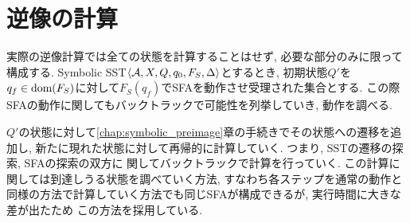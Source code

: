 \documentclass[uplatex,dvipdfmx,a4j]{jsreport}
\begin{document}
  \section{逆像の計算}

  実際の逆像計算では全ての状態を計算することはせず, 必要な部分のみに限って構成する.
  Symbolic SST${\langle {\mathcal{A}, X, Q, q_0, F_S, \Delta} \rangle}$とするとき,
  初期状態$Q'$を$q_f \in \mbox{dom}(F_S)$に対して$F_S(q_f)$でSFAを動作させ受理された集合とする.
  この際SFAの動作に関してもバックトラックで可能性を列挙していき, 動作を調べる.

  $Q'$の状態に対して\ref{chap:symbolic_preimage}章の手続きでその状態への遷移を追加し,
  新たに現れた状態に対して再帰的に計算していく. つまり, SSTの遷移の探索, SFAの探索の双方に
  関してバックトラックで計算を行っていく. この計算に関しては到達しうる状態を調べていく方法,
  すなわち各ステップを通常の動作と同様の方法で計算していく方法でも同じSFAが構成できるが, 実行時間に大きな差が出たため
  この方法を採用している.

  \begin{example}

  \end{example}
\end{document}
